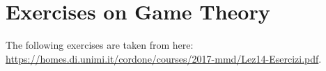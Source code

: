 \documentclass[\main/main.tex]{subfiles}
\begin{document}
\section{Exercises on Game Theory}
The following exercises are taken from here: \url{https://homes.di.unimi.it/cordone/courses/2017-mmd/Lez14-Esercizi.pdf}.





\end{document}
